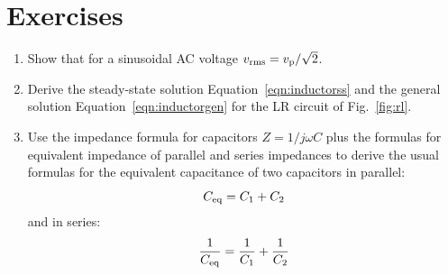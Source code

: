 \documentclass[12pt,oneside]{book}
\begin{document}
\section{Exercises}
\begin{enumerate}
\item Show that for a sinusoidal AC voltage $v_{\rm rms} = v_{\rm p} / \sqrt{2}$.
\item Derive the steady-state solution Equation~\ref{eqn:inductorss} and the general solution Equation~\ref{eqn:inductorgen} for the LR circuit of Fig.~\ref{fig:rl}.


\item Use the impedance formula for capacitors $Z=1/j \omega C $ plus the formulas for equivalent impedance of parallel and series impedances to derive the usual formulas for the equivalent capacitance  of two capacitors in parallel:
\begin{displaymath}
C_{\rm eq} = C_1 + C_2
\end{displaymath}
and in series:
\begin{displaymath}
\frac{1}{C_{\rm eq}} = \frac{1}{C_1} + \frac{1}{C_2}
\end{displaymath}


\end{enumerate}
\end{document}
